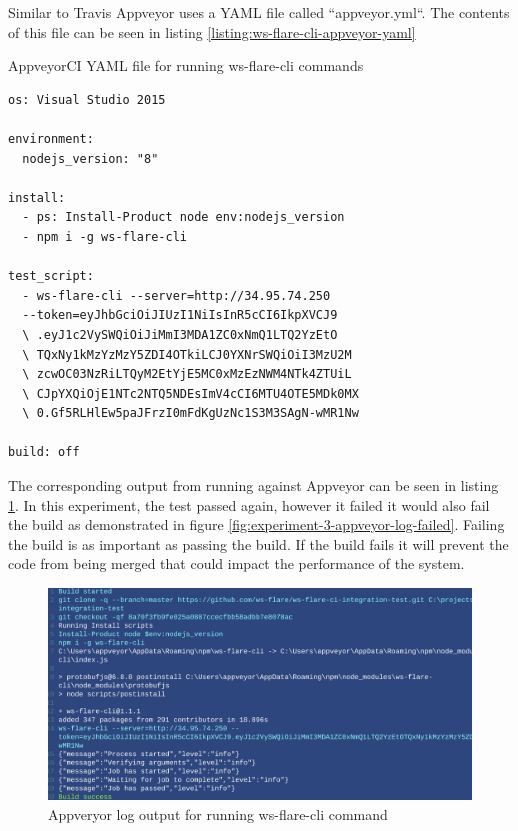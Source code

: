 Similar to Travis Appveyor uses a YAML file called ``appveyor.yml``. The contents of this file can be seen in listing \ref{listing:ws-flare-cli-appveyor-yaml}

\begin{listing}[H]
    \caption{AppveyorCI YAML file for running ws-flare-cli commands}
    \label{listing:ws-flare-cli-appveyor-yaml}
    \begin{verbatim}
os: Visual Studio 2015

environment:
  nodejs_version: "8"

install:
  - ps: Install-Product node env:nodejs_version
  - npm i -g ws-flare-cli

test_script:
  - ws-flare-cli --server=http://34.95.74.250 
  --token=eyJhbGciOiJIUzI1NiIsInR5cCI6IkpXVCJ9
  \ .eyJ1c2VySWQiOiJiMmI3MDA1ZC0xNmQ1LTQ2YzEtO
  \ TQxNy1kMzYzMzY5ZDI4OTkiLCJ0YXNrSWQiOiI3MzU2M
  \ zcwOC03NzRiLTQyM2EtYjE5MC0xMzEzNWM4NTk4ZTUiL
  \ CJpYXQiOjE1NTc2NTQ5NDEsImV4cCI6MTU4OTE5MDk0MX
  \ 0.Gf5RLHlEw5paJFrzI0mFdKgUzNc1S3M3SAgN-wMR1Nw

build: off
\end{verbatim}
\end{listing}

The corresponding output from running against Appveyor can be seen in listing \ref{fig:experiment-3-appveyor-log}. In this experiment, the test passed again, however it failed it would also fail the build as demonstrated in figure \ref{fig:experiment-3-appveyor-log-failed}. Failing the build is as important as passing the build. If the build fails it will prevent the code from being merged that could impact the performance of the system.

\begin{figure}[H]
  \centering
    \includegraphics[width=1\textwidth]{figures/experiments/experiment-3/appveyor-output.png}
    \caption{Appveryor log output for running ws-flare-cli command}
    \label{fig:experiment-3-appveyor-log}
\end{figure}

